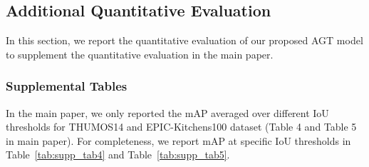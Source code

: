 \documentclass[10pt,twocolumn,letterpaper]{article}
\begin{document}
\subsection{Additional Quantitative Evaluation}
In this section, we report the quantitative evaluation of our proposed AGT model to supplement the quantitative evaluation in the main paper.

\subsubsection{Supplemental Tables}
\label{subsec:eval_supp}
In the main paper, we only reported the mAP averaged over different IoU thresholds for THUMOS14 and EPIC-Kitchens100 dataset (Table 4 and Table 5 in main paper). For completeness, we report mAP at specific IoU thresholds in Table~\ref{tab:supp_tab4} and Table~\ref{tab:supp_tab5}.
\end{document}
